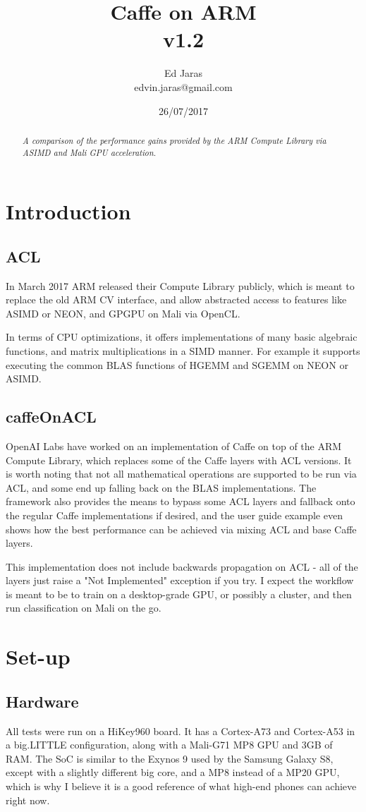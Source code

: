 \documentclass[12pt, a4paper, notitlepage]{report}
\title{Caffe on ARM \\ v1.2}
\author{Ed Jaras \\edvin.jaras@gmail.com}
\date{26/07/2017}
\begin{document}
\maketitle
\thispagestyle{empty}
\begin{abstract}
\textit{A comparison of the performance gains provided by the ARM Compute Library via ASIMD and Mali GPU acceleration.}
\end{abstract}
\section*{Introduction}
\subsection*{ACL}
In March 2017 ARM released their Compute Library publicly, which is meant to replace the old ARM CV interface, and allow abstracted access to features like ASIMD or NEON, and GPGPU on Mali via OpenCL.\cite{acl_post}

In terms of CPU optimizations, it offers implementations of many basic algebraic functions, and matrix multiplications in a SIMD manner. For example it supports executing the common BLAS functions of HGEMM and SGEMM on NEON or ASIMD.

\subsection*{caffeOnACL}
OpenAI Labs have worked on an implementation of Caffe on top of the ARM Compute Library, which replaces some of the Caffe layers with ACL versions. It is worth noting that not all mathematical operations are supported to be run via ACL, and some end up falling back on the BLAS implementations. The framework also provides the means to bypass some ACL layers and fallback onto the regular Caffe implementations if desired, and the user guide example even shows how the best performance can be achieved via mixing ACL and base Caffe layers.\cite{coacl}

This implementation does not include backwards propagation on ACL - all of the layers just raise a "Not Implemented" exception if you try. I expect the workflow is meant to be to train on a desktop-grade GPU, or possibly a cluster, and then run classification on Mali on the go.

\section*{Set-up}
\subsection*{Hardware}
All tests were run on a HiKey960 board. It has a Cortex-A73 and Cortex-A53 in a big.LITTLE configuration, along with a Mali-G71 MP8 GPU and 3GB of RAM. The SoC is similar to the Exynos 9 used by the Samsung Galaxy S8, except with a slightly different big core, and a MP8 instead of a MP20 GPU, which is why I believe it is a good reference of what high-end phones can achieve right now.\cite{galaxy}
\end{document}
